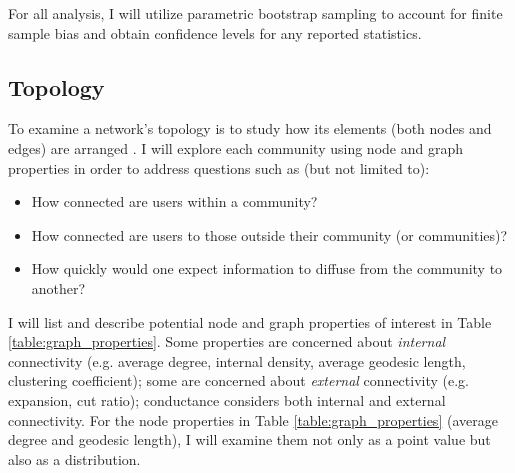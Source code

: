 \documentclass[acmlarge, screen, authorversion]{acmart}
\begin{document}
For all analysis, I will utilize parametric bootstrap sampling \cite{gentzkowMeasuringGroupDifferences2019} to account for finite sample bias and obtain confidence levels for any reported statistics.

\subsection{Topology}

To examine a network's topology is to study how its elements (both nodes and edges) are arranged \cite{goldenbergSurveyStatisticalNetwork2010}. I will explore each community using node and graph properties in order to address questions such as (but not limited to):

\begin{itemize}
	\item How connected are users within a community?
	\item How connected are users to those outside their community (or communities)?
	\item How quickly would one expect information to diffuse from the community to another?
\end{itemize}

I will list and describe potential node and graph properties of interest
\cite{yangDefiningEvaluatingNetwork2015} in Table \ref{table:graph_properties}.
Some properties are concerned about \textit{internal} connectivity (e.g. average
degree, internal density, average geodesic length, clustering coefficient); some
are concerned about \textit{external} connectivity (e.g. expansion, cut ratio);
conductance considers both internal and external connectivity. For the node
properties in Table \ref{table:graph_properties} (average degree and geodesic
length), I will examine them not only as a point value but also as a
distribution.
\end{document}
